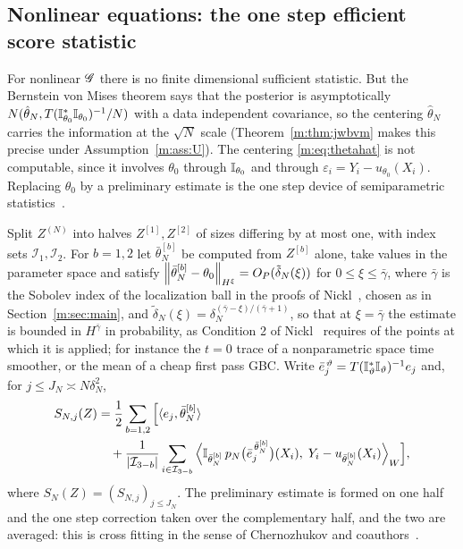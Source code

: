 \subsection{Nonlinear equations: the one step efficient score statistic}

For nonlinear $\mathscr{G}$ there is no finite dimensional sufficient statistic. But the Bernstein von Mises theorem says that the posterior is asymptotically $N(\hat\theta_N,T(\mathbb{I}^*_{\theta_0}\mathbb{I}_{\theta_0})^{-1}/N)$ with a data independent covariance, so the centering $\hat\theta_N$ carries the information at the $\sqrt N$ scale (Theorem~\ref{m:thm:jwbvm} makes this precise under Assumption~\ref{m:ass:U}). The centering \eqref{m:eq:thetahat} is not computable, since it involves $\theta_0$ through $\mathbb{I}_{\theta_0}$ and through $\varepsilon_i=Y_i-u_{\theta_0}(X_i)$. Replacing $\theta_0$ by a preliminary estimate is the one step device of semiparametric statistics~\cite{vandervaart1998}.

\begin{definition}\label{m:def:summary}
Split $Z^{(N)}$ into halves $Z^{[1]},Z^{[2]}$ of sizes differing by at most one, with index sets $\mathcal I_1,\mathcal I_2$. For $b=1,2$ let $\bar\theta^{[b]}_N$ be computed from $Z^{[b]}$ alone, take values in the parameter space and satisfy $\left\|\bar\theta^{[b]}_N-\theta_0\right\|_{H^\xi}=O_P(\tilde\delta_N(\xi))$ for $0\le\xi\le\bar\gamma$, where $\bar\gamma$ is the Sobolev index of the localization ball in the proofs of Nickl~\cite{nicklbvm2024}, chosen as in Section~\ref{m:sec:main}, and $\tilde\delta_N(\xi)=\delta_N^{(\bar\gamma-\xi)/(\bar\gamma+1)}$, so that at $\xi=\bar\gamma$ the estimate is bounded in $H^{\bar\gamma}$ in probability, as Condition 2 of Nickl~\cite{nicklbvm2024} requires of the points at which it is applied; for instance the $t=0$ trace of a nonparametric space time smoother, or the mean of a cheap first pass GBC. Write $\bar e_j^{\,\vartheta}=T(\mathbb{I}^*_\vartheta\mathbb{I}_\vartheta)^{-1}e_j$ and, for $j\le J_N\asymp N\delta_N^2$,
\begin{equation}\label{m:eq:summary}
\begin{aligned}
S_{N,j}(Z)&=\frac12\sum_{b=1,2}\Big[\langle e_j,\bar\theta^{[b]}_N\rangle\\
&\quad+\frac{1}{|\mathcal I_{3-b}|}\sum_{i\in\mathcal I_{3-b}}\Big\langle\mathbb{I}_{\bar\theta^{[b]}_N}\,p_N\big(\bar e_j^{\,\bar\theta^{[b]}_N}\big)(X_i),\;Y_i-u_{\bar\theta^{[b]}_N}(X_i)\Big\rangle_W\Big],
\end{aligned}
\end{equation}
where $S_N(Z)=(S_{N,j})_{j\le J_N}$. The preliminary estimate is formed on one half and the one step correction taken over the complementary half, and the two are averaged: this is cross fitting in the sense of Chernozhukov and coauthors~\cite{chernozhukov2018}.
\end{definition}

